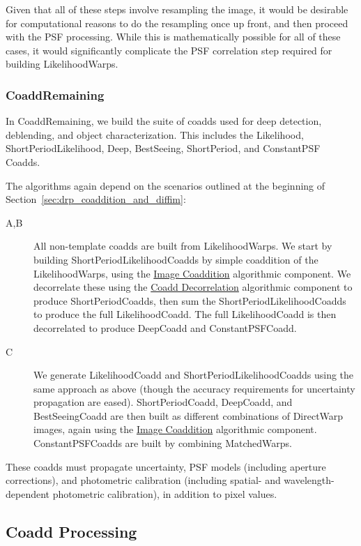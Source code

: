 Given that all of these steps involve resampling the image, it would be desirable for computational reasons to do the resampling once up front, and then proceed with the PSF processing.  While this is mathematically possible for all of these cases, it would significantly complicate the PSF correlation step required for building LikelihoodWarps.

\subsubsection{CoaddRemaining}
\label{sec:drpCoaddRemaining}

In CoaddRemaining, we build the suite of coadds used for deep detection, deblending, and object characterization.  This includes the Likelihood, ShortPeriodLikelihood, Deep, BestSeeing, ShortPeriod, and ConstantPSF Coadds.

The algorithms again depend on the scenarios outlined at the beginning of Section~\ref{sec:drp_coaddition_and_diffim}:
\begin{description}
\item[A,B] All non-template coadds are built from LikelihoodWarps.  We start by building ShortPeriodLikelihoodCoadds by simple coaddition of the LikelihoodWarps, using the \hyperref[sec:acCoaddition]{Image Coaddition} algorithmic component.  We decorrelate these using the \hyperref[sec:acCoaddDecorrelation]{Coadd Decorrelation} algorithmic component to produce ShortPeriodCoadds, then sum the ShortPeriodLikelihoodCoadds to produce the full LikelihoodCoadd.  The full LikelihoodCoadd is then decorrelated to produce DeepCoadd and ConstantPSFCoadd.
\item[C] We generate LikelihoodCoadd and ShortPeriodLikelihoodCoadds using the same approach as above (though the accuracy requirements for uncertainty propagation are eased). ShortPeriodCoadd, DeepCoadd, and BestSeeingCoadd are then built as different combinations of DirectWarp images, again using the \hyperref[sec:acCoaddition]{Image Coaddition} algorithmic component.  ConstantPSFCoadds are built by combining MatchedWarps.
\end{description}

These coadds must propagate uncertainty, PSF models (including aperture corrections), and photometric calibration (including spatial- and wavelength-dependent photometric calibration), in addition to pixel values.

\subsection{Coadd Processing}
\label{sec:drp_coadd_processing}

